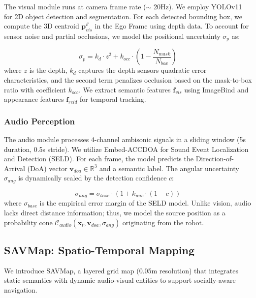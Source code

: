 The visual module runs at camera frame rate (\(\sim\) 20Hz). We employ
YOLOv11 \cite{YOLOv11OverviewKey2024} for 2D object detection and
segmentation. For each detected bounding box, we compute the 3D centroid
\(\mathbf{p}_{vis}^{\mathcal{E}}\) in the Ego Frame using depth data.
To account for sensor noise and partial occlusions, we model the
positional uncertainty \(\sigma_{p}\) as:

\begin{equation}
    \sigma_{p} = k_d \cdot z^2 + k_{occ} \cdot \left(1 - \frac{N_{mask}}{N_{box}}\right)
\end{equation}
where \(z\) is the depth, \(k_d\) captures the depth
sensor\textquotesingle s quadratic error characteristics, and the second
term penalizes occlusion based on the mask-to-box ratio with coefficient
\(k_{occ}\). We extract semantic features \(\mathbf{f}_{vis}\) using
ImageBind \cite{ImageBindOneEmbedding2023} and appearance features
\(\mathbf{f}_{reid}\) for temporal tracking.

\subsubsection{Audio Perception}\label{audio-perception}

The audio module processes 4-channel ambisonic signals in a sliding
window (5s duration, 0.5s stride). We utilize Embed-ACCDOA
\cite{OpenvocabularySoundEvent2025} for Sound Event Localization and
Detection (SELD).
For each frame, the model predicts the Direction-of-Arrival (DoA) vector
\(\mathbf{v}_{doa} \in \mathbb{R}^3\) and a semantic label. The angular
uncertainty \(\sigma_{ang}\) is dynamically scaled by the detection
confidence \(c\):

\begin{equation}
    \sigma_{ang} = \sigma_{base} \cdot (1 + k_{unc} \cdot (1 - c))
\end{equation}
where \(\sigma_{base}\) is the empirical error margin of the SELD model.
Unlike vision, audio lacks direct distance information; thus, we model
the source position as a probability cone
\(\mathcal{C}_{audio}(\mathbf{x}_t, \mathbf{v}_{doa}, \sigma_{ang})\)
originating from the robot.

\subsection{SAVMap: Spatio-Temporal
    Mapping}\label{savmap-spatio-temporal-mapping}

We introduce SAVMap, a layered grid map (0.05m resolution) that
integrates static semantics with dynamic audio-visual entities to
support socially-aware navigation.

